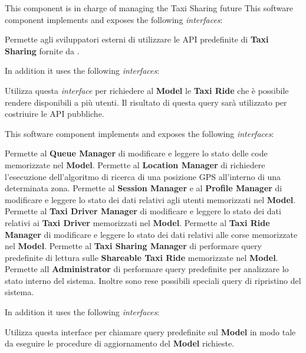 \begin{itemize}
\begin{itemize}
		This component is in charge of managing the Taxi Sharing future 
		This software component implements and exposes the following \textit{interfaces}:
		\begin{itemize}
			 Permette agli sviluppatori esterni di utilizzare le API predefinite  di \textbf{Taxi Sharing} fornite da \myTaxiService{}.
		\end{itemize}
		In addition it uses the following \textit{interfaces}:
		\begin{itemize}
			 Utilizza questa \textit{interface} per richiedere al \textbf{Model} le \textbf{Taxi Ride} che è possibile rendere disponibili a più utenti. 
			Il risultato di questa query sarà utilizzato per costriuire le API pubbliche.
		\end{itemize}
		
		\itemBold{Query Manager}
		This software component implements and exposes the following \textit{interfaces}:
		\begin{itemize}
			 Permette al \textbf{Queue Manager} di modificare e leggere lo stato delle code memorizzate nel \textbf{Model}.
			 Permette al \textbf{Location Manager} di richiedere l'esecuzione dell'algoritmo di ricerca di una posizione GPS all'interno di una  determinata zona.
			 Permette al \textbf{Session Manager} e al \textbf{Profile Manager} di modificare e leggere lo stato dei dati relativi agli utenti memorizzati nel \textbf{Model}.
			 Permette al \textbf{Taxi Driver Manager} di modificare e leggere lo stato dei dati relativi ai \textbf{Taxi Driver} memorizzati nel \textbf{Model}.
			 Permette al \textbf{Taxi Ride Manager} di modificare e leggere lo stato dei dati relativi alle corse memorizzate nel \textbf{Model}.
			 Permette al \textbf{Taxi Sharing Manager} di performare query predefinite di lettura sulle \textbf{Shareable Taxi Ride} memorizzate nel \textbf{Model}.
			 Permette all \textbf{Administrator} di performare query predefinite per analizzare lo stato interno del sistema.
			Inoltre sono rese possibili speciali query di ripristino del sistema.
		\end{itemize}
		In addition it uses the following \textit{interfaces}:
		\begin{itemize}
			 Utilizza questa interface per chiamare query predefinite sul \textbf{Model} in modo tale da eseguire le procedure di aggiornamento del \textbf{Model} richieste.
		\end{itemize}
	\end{itemize}
	

\end{itemize}
